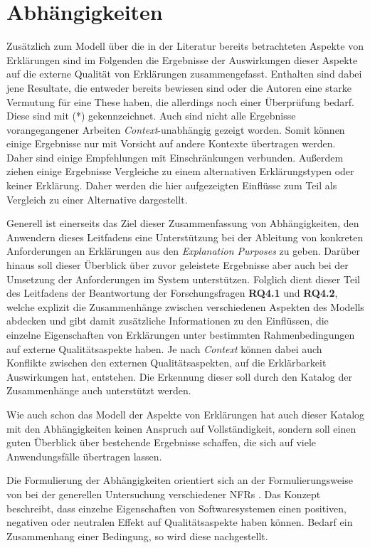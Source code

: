 \section{Abhängigkeiten}
\label{sec:model_proved_relations}

Zusätzlich zum Modell über die in der Literatur bereits betrachteten Aspekte von Erklärungen sind im Folgenden die Ergebnisse der Auswirkungen dieser Aspekte auf die externe Qualität von Erklärungen zusammengefasst. Enthalten sind dabei jene Resultate, die entweder bereits bewiesen sind oder die Autoren eine starke Vermutung für eine These haben, die allerdings noch einer Überprüfung bedarf. Diese sind mit (*) gekennzeichnet. Auch sind nicht alle Ergebnisse vorangegangener Arbeiten \textit{Context}-unabhängig gezeigt worden. Somit können einige Ergebnisse nur mit Vorsicht auf andere Kontexte übertragen werden. Daher sind einige Empfehlungen mit Einschränkungen verbunden. Außerdem ziehen einige Ergebnisse Vergleiche zu einem alternativen Erklärungstypen oder keiner Erklärung. Daher werden die hier aufgezeigten Einflüsse zum Teil als Vergleich zu einer Alternative dargestellt.

Generell ist einerseits das Ziel dieser Zusammenfassung von Abhängigkeiten, den Anwendern dieses Leitfadens eine Unterstützung bei der Ableitung von konkreten Anforderungen an Erklärungen aus den \textit{Explanation Purposes} zu geben. Darüber hinaus soll dieser Überblick über zuvor geleistete Ergebnisse aber auch bei der Umsetzung der Anforderungen im System unterstützen. Folglich dient dieser Teil des Leitfadens der Beantwortung der Forschungsfragen \textbf{RQ4.1} und \textbf{RQ4.2}, welche explizit die Zusammenhänge zwischen verschiedenen Aspekten des Modells abdecken und gibt damit zusätzliche Informationen zu den Einflüssen, die einzelne Eigenschaften von Erklärungen unter bestimmten Rahmenbedingungen auf externe Qualitätsaspekte haben. Je nach \textit{Context} können dabei auch Konflikte zwischen den externen Qualitätsaspekten, auf die Erklärbarkeit Auswirkungen hat, entstehen. Die Erkennung dieser soll durch den Katalog der Zusammenhänge auch unterstützt werden.

Wie auch schon das Modell der Aspekte von Erklärungen hat auch dieser Katalog mit den Abhängigkeiten keinen Anspruch auf Vollständigkeit, sondern soll einen guten Überblick über bestehende Ergebnisse schaffen, die sich auf viele Anwendungsfälle übertragen lassen.

Die Formulierung der Abhängigkeiten orientiert sich an der Formulierungsweise von \citeauthor{carvalho2020developers} bei der generellen Untersuchung verschiedener NFRs \cite{carvalho2020developers}. Das Konzept beschreibt, dass einzelne Eigenschaften von Softwaresystemen einen positiven, negativen oder neutralen Effekt auf Qualitätsaspekte haben können. Bedarf ein Zusammenhang einer Bedingung, so wird diese nachgestellt.

